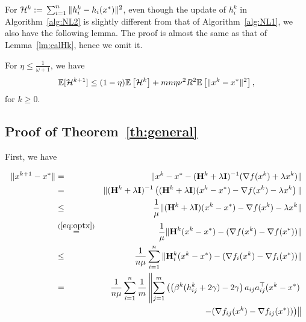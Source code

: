 \documentclass[12pt]{article}
\newcommand{\eqdef}{\; { := }\;}
\newcommand{\ExpBr}[1]{\mathbb{E}\left[#1\right]}
\newcommand{\newalpha}{h}
\newcommand{\mH}{\mathbf{H}}
\newcommand{\mI}{\mathbf{I}}
\begin{document}
For ${\cal H}^k \eqdef \sum_{i=1}^n \|h_i^k - \newalpha_i(x^*)\|^2$, even though the update of $h_i^k$ in Algorithm~\ref{alg:NL2} is slightly different from that of Algorithm~\ref{alg:NL1}, we also have the following lemma. The proof is almost the same as that of Lemma~\ref{lm:calHk}, hence we omit it. 

\begin{lemma}\label{lm:calHk-2} For $\eta \leq \frac{1}{\omega+1}$, we have 
	$$
	\mathbb{E}[{\cal H}^{k+1}] \leq  (1-\eta) \ExpBr{{\cal H}^k} + m n \eta \nu^2 R^2 \ExpBr{\|x^k - x^*\|^2}, 
	$$
	for $k\geq 0$. 
\end{lemma}


\subsection{Proof of Theorem~\ref{th:general}}


First, we have 

\begin{eqnarray*}
	\|x^{k+1} - x^*\| &=& \| x^k - x^* - (\mH^k + \lambda \mI)^{-1} (\nabla f(x^k) + \lambda x^k) \| \\
	&=& \|(\mH^k + \lambda \mI)^{-1} \left(  (\mH^k + \lambda \mI)(x^k - x^*) - \nabla f(x^k) - \lambda x^k  \right) \| \\ 
	&\leq& \frac{1}{\mu} \|  (\mH^k + \lambda \mI)(x^k - x^*) - \nabla f(x^k) - \lambda x^k  \| \\ 
	&\overset{(\ref{eq:optx})}{=}& \frac{1}{\mu} \| \mH^k (x^k - x^*) - (\nabla f(x^k) - \nabla f(x^*)) \| \\ 
	&\leq& \frac{1}{n \mu} \sum_{i=1}^n \| \mH_i^k (x^k - x^*) - (\nabla f_i(x^k) - \nabla f_i(x^*)) \| \\
	&=& \frac{1}{n \mu} \sum_{i=1}^n \frac{1}{m} \left\|  \sum_{j=1}^{m} \left( \left( \beta^k (h_{ij}^k + 2\gamma) - 2\gamma \right)a_{ij}a_{ij}^\top (x^k - x^*)\right.\right.\notag\\
	&&\quad \left.\left.-  (\nabla f_{ij}(x^k) - \nabla f_{ij}(x^*)) \right)   \right\| 
\end{eqnarray*}
\end{document}
